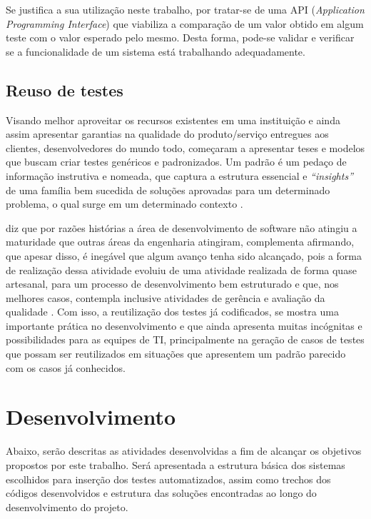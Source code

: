 \documentclass[tg]{mdtufsm}
\begin{document}
Se justifica a sua utilização neste trabalho, por tratar-se de uma API (\emph{Application Programming Interface}) que viabiliza a comparação de um valor obtido em algum teste com o valor esperado pelo mesmo. Desta forma, pode-se validar e verificar se
a funcionalidade de um sistema está trabalhando adequadamente.

\section{Reuso de testes}

Visando melhor aproveitar os recursos existentes em uma instituição e ainda assim apresentar garantias na qualidade do produto/serviço entregues aos clientes, desenvolvedores do mundo todo, começaram a apresentar
teses e modelos que buscam criar testes genéricos e padronizados. Um padrão é um pedaço de informação instrutiva e nomeada, que captura a estrutura essencial
e \emph{“insights”} de uma família bem sucedida de soluções aprovadas para um determinado problema, o qual surge em um determinado contexto \cite{cagnin2004reuso}.

\citeauthor{guizzardi2000desenvolvimento} diz que por razões histórias a área de desenvolvimento de software não atingiu a maturidade que outras áreas da engenharia atingiram, complementa afirmando,
que apesar disso, é inegável que algum avanço tenha sido alcançado, pois a forma de realização dessa atividade evoluiu de uma atividade realizada de forma quase artesanal, para um processo de
desenvolvimento bem estruturado e que, nos melhores casos, contempla inclusive atividades de gerência e avaliação da qualidade \cite{guizzardi2000desenvolvimento}.
Com isso, a reutilização dos testes já codificados, se mostra uma importante prática no desenvolvimento e que ainda apresenta muitas incógnitas e possibilidades para as equipes de TI,
principalmente na geração de casos de testes que possam ser reutilizados em situações que apresentem um padrão parecido com os casos já conhecidos.

\chapter{Desenvolvimento}

Abaixo, serão descritas as atividades desenvolvidas a fim de alcançar os objetivos propostos por este trabalho. Será apresentada a estrutura básica dos sistemas escolhidos para inserção dos testes automatizados,
assim como trechos dos códigos desenvolvidos e estrutura das soluções encontradas ao longo do desenvolvimento do projeto.
\end{document}
